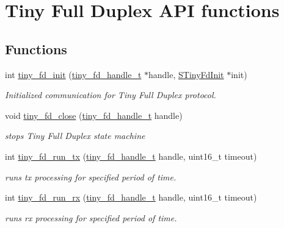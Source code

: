 \hypertarget{group__FULL__DUPLEX__API}{}\section{Tiny Full Duplex A\+PI functions}
\label{group__FULL__DUPLEX__API}
\subsection*{Functions}
\begin{DoxyCompactItemize}
\item 
int \hyperlink{group__FULL__DUPLEX__API_ga73c3e76cfbcd7b9bb8e1f7826175774b}{tiny\+\_\+fd\+\_\+init} (\hyperlink{tiny__fd_8h_a91e6b79431fe38570fb102701ef0b7e8}{tiny\+\_\+fd\+\_\+handle\+\_\+t} $\ast$handle, \hyperlink{tiny__fd_8h_ac931714d7bbe299856f4533fd1edb7f6}{S\+Tiny\+Fd\+Init} $\ast$init)
\begin{DoxyCompactList}\small\item\em Initialized communication for Tiny Full Duplex protocol. \end{DoxyCompactList}\item 
void \hyperlink{group__FULL__DUPLEX__API_ga11e470503e3359bc29a5bcb65a9771d5}{tiny\+\_\+fd\+\_\+close} (\hyperlink{tiny__fd_8h_a91e6b79431fe38570fb102701ef0b7e8}{tiny\+\_\+fd\+\_\+handle\+\_\+t} handle)
\begin{DoxyCompactList}\small\item\em stops Tiny Full Duplex state machine \end{DoxyCompactList}\item 
int \hyperlink{group__FULL__DUPLEX__API_ga601c9874a570331580856c1ea28f7914}{tiny\+\_\+fd\+\_\+run\+\_\+tx} (\hyperlink{tiny__fd_8h_a91e6b79431fe38570fb102701ef0b7e8}{tiny\+\_\+fd\+\_\+handle\+\_\+t} handle, uint16\+\_\+t timeout)
\begin{DoxyCompactList}\small\item\em runs tx processing for specified period of time. \end{DoxyCompactList}\item 
int \hyperlink{group__FULL__DUPLEX__API_gad31f944514aef01e27bc3ec67fdbe140}{tiny\+\_\+fd\+\_\+run\+\_\+rx} (\hyperlink{tiny__fd_8h_a91e6b79431fe38570fb102701ef0b7e8}{tiny\+\_\+fd\+\_\+handle\+\_\+t} handle, uint16\+\_\+t timeout)
\begin{DoxyCompactList}\small\item\em runs rx processing for specified period of time. \end{DoxyCompactList}\item 

\end{DoxyCompactItemize}
